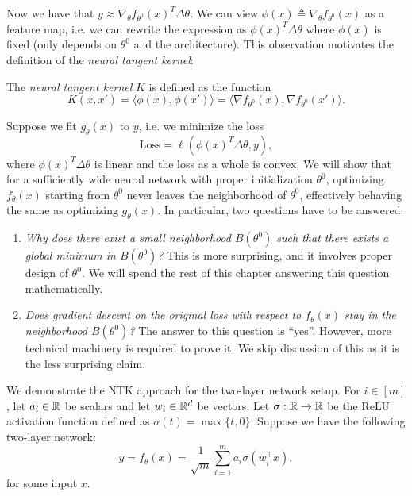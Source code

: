 Now we have that $y \approx \nabla_\theta f_{\theta^0}(x)^T \Delta \theta$. We can view $\phi(x) \triangleq \nabla_\theta f_{\theta^0}(x)$ as a feature map, i.e. we can rewrite the expression as $\phi(x)^T \Delta \theta$ where $\phi(x)$ is fixed (only depends on $\theta^0$ and the architecture). This observation motivates the definition of the \textit{neural tangent kernel}:

\begin{definition}
The \emph{neural tangent kernel} $K$ is defined as the function
\begin{equation}
K(x, x') = \langle \phi(x), \phi(x')\rangle = \langle \nabla f_{\theta^0}(x), \nabla f_{\theta^0}(x') \rangle.
\end{equation}
\end{definition}

Suppose we fit $g_\theta(x)$ to $y$, i.e. we minimize the loss 
\begin{equation}
\textrm{Loss} = \ell(\phi(x)^T \Delta \theta, y),
\end{equation}
where $\phi(x)^T\Delta \theta$ is linear and the loss as a whole is convex.
We will show that for a sufficiently wide neural network with proper initialization $\theta^0$, optimizing $f_\theta(x)$ starting from $\theta^0$ never leaves the neighborhood of $\theta^0$, effectively behaving the same as optimizing $g_\theta(x)$. In particular, two questions have to be answered:

\begin{enumerate}
    \item \textit{Why does there exist a small neighborhood $B(\theta^0)$ such that there exists a global minimum in $B(\theta^0)$?} This is more surprising, and it involves proper design of $\theta^0$. We will spend the rest of this chapter answering this question mathematically.
    \item \textit{Does gradient descent on the original loss with respect to $f_\theta(x)$ stay in the neighborhood $B(\theta^0)$?} The answer to this question is ``yes''. However, more technical machinery is required to prove it. We skip discussion of this as it is the less surprising claim.
\end{enumerate}


We demonstrate the NTK approach for the two-layer network setup. For $i \in [m]$, let $a_i \in \mathbb R$ be scalars and let $w_i \in \mathbb R^d$ be vectors. Let $\sigma: \mathbb R \to \mathbb R$ be the ReLU activation function defined as $\sigma(t) = \max\{ t, 0\}$. Suppose we have the following two-layer network:
\begin{equation}\label{lec12:eqn:network}
\hat{y} = f_\theta(x) = \frac{1}{\sqrt{m}} \sum_{i=1}^m a_i \sigma (w_i^\top x),
\end{equation}
for some input $x$.

